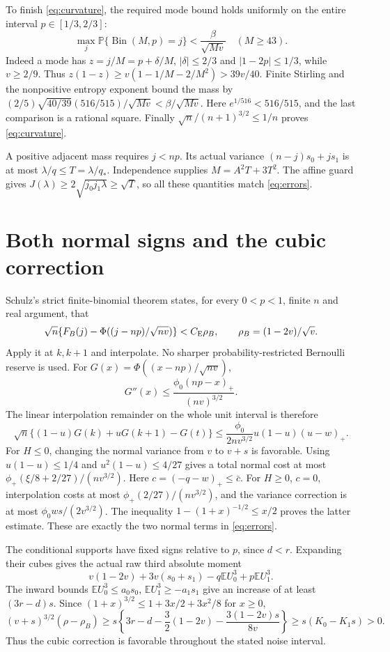 \documentclass[11pt]{article}
\newcommand{\E}{\mathbb E}\newcommand{\Pp}{\mathbb P}
\newcommand{\CE}{C_{\rm E}}\newcommand{\ph}{\phi_0}
\begin{document}
To finish \eqref{eq:curvature}, the required mode bound holds uniformly
on the entire interval $p\in[1/3,2/3]$:
\[
\max_j\Pp\{\operatorname{Bin}(M,p)=j\}<\frac{\beta}{\sqrt{Mv}}
\quad(M\ge43).
\]
Indeed a mode has $z=j/M=p+\delta/M$, $|\delta|\le2/3$ and
$|1-2p|\le1/3$, while $v\ge2/9$. Thus
$z(1-z)\ge v(1-1/M-2/M^2)>39v/40$.
Finite Stirling and the nonpositive entropy exponent bound the mass by
$(2/5)\sqrt{40/39}(516/515)/\sqrt{Mv}<\beta/\sqrt{Mv}$.
Here $e^{1/516}<516/515$, and the last comparison is a rational square.
Finally $\sqrt n/(n+1)^{3/2}\le1/n$ proves \eqref{eq:curvature}.

A positive adjacent mass requires $j<np$. Its actual variance
$(n-j)s_0+js_1$ is at most $\lambda/q\le T=\lambda/q_*$.
Independence supplies $M=A^2T+3T^2$.
The affine guard gives $J(\lambda)\ge2\sqrt{j_0j_1\lambda}
\ge\sqrt T$, so all these quantities match \eqref{eq:errors}.

\section{Both normal signs and the cubic correction}

Schulz's strict finite-binomial theorem \cite[Theorem 1]{Schulz} states,
for every $0<p<1$, finite $n$ and real argument, that
\[
\sqrt n\{F_B(j)-\Phi((j-np)/\sqrt{nv})\}<\CE\rho_B,
\qquad \rho_B=(1-2v)/\sqrt v.
\]
Apply it at $k,k+1$ and interpolate. No sharper probability-restricted
Bernoulli reserve is used. For $G(x)=\Phi((x-np)/\sqrt{nv})$,
\[
G''(x)\le\frac{\ph(np-x)_+}{(nv)^{3/2}}.
\]
The linear interpolation remainder on the whole unit interval is therefore
\[
\sqrt n\{(1-u)G(k)+uG(k+1)-G(t)\}
\le\frac{\ph}{2nv^{3/2}}u(1-u)(u-w)_+.
\]
For $H\le0$, changing the normal variance from $v$ to $v+s$ is
favorable. Using $u(1-u)\le1/4$ and $u^2(1-u)\le4/27$ gives a total
normal cost at most $\phi_+(\xi/8+2/27)/(nv^{3/2})$.
Here $c=(-q-w)_+\le\bar c$.
For $H\ge0$, $c=0$, interpolation costs at most
$\phi_+(2/27)/(nv^{3/2})$, and the variance correction is at most
$\ph ws/(2v^{3/2})$. The inequality
$1-(1+x)^{-1/2}\le x/2$ proves the latter estimate.
These are exactly the two normal terms in \eqref{eq:errors}.

The conditional supports have fixed signs relative to $p$, since $d<r$.
Expanding their cubes gives the actual raw third absolute moment
\[
v(1-2v)+3v(s_0+s_1)-q\E U_0^3+p\E U_1^3.
\]
The inward bounds $\E U_0^3\le a_0s_0$, $\E U_1^3\ge-a_1s_1$
give an increase of at least $(3r-d)s$. Since
$(1+x)^{3/2}\le1+3x/2+3x^2/8$ for $x\ge0$,
\[
(v+s)^{3/2}(\rho-\rho_B)
\ge s\left\{3r-d-\frac32(1-2v)-\frac{3(1-2v)s}{8v}\right\}
\ge s(K_0-K_1s)>0.
\]
Thus the cubic correction is favorable throughout the stated noise interval.
\end{document}
